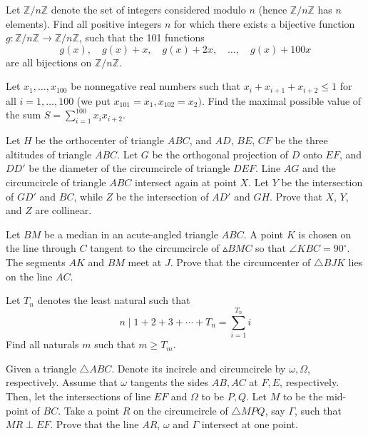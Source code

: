 \documentclass[11pt]{scrartcl}
\begin{document}
\begin{problem}[1856371892766039579]
Let $\mathbb{Z}/n\mathbb{Z}$ denote the set of integers considered modulo $n$ (hence $\mathbb{Z}/n\mathbb{Z}$ has $n$ elements). Find all positive integers $n$ for which there exists a bijective function $g: \mathbb{Z}/n\mathbb{Z} \to \mathbb{Z}/n\mathbb{Z}$, such that the 101 functions
\[g(x), \quad g(x) + x, \quad g(x) + 2x, \quad \dots, \quad g(x) + 100x\]are all bijections on $\mathbb{Z}/n\mathbb{Z}$.
\end{problem}
\begin{problem}[1862468241301875616]
	Let $x_1, \ldots , x_{100}$ be nonnegative real numbers such that $x_i + x_{i+1} + x_{i+2} \leq 1$ for all $i = 1, \ldots , 100$ (we put $x_{101 } = x_1, x_{102} = x_2).$ Find the maximal possible value of the sum $S = \sum^{100}_{i=1} x_i x_{i+2}.$
\end{problem}
\begin{problem}[1872712387771032593]
Let $H$ be the orthocenter of triangle $ABC$, and $AD$, $BE$, $CF$ be the three altitudes of triangle $ABC$. Let $G$ be the orthogonal projection of $D$ onto $EF$, and $DD'$ be the diameter of the circumcircle of triangle $DEF$. Line $AG$ and the circumcircle of triangle $ABC$ intersect again at point $X$. Let $Y$ be the intersection of $GD'$ and $BC$, while $Z$ be the intersection of $AD'$ and $GH$. Prove that $X$, $Y$, and $Z$ are collinear.
\end{problem}
\begin{problem}[1891712635906763103]
	Let $BM$ be a median in an acute-angled triangle $ABC$. A point $K$ is chosen on the line through $C$ tangent to the circumcircle of $\vartriangle BMC$ so that $\angle KBC = 90^\circ$. The segments $AK$ and $BM$ meet at $J$. Prove that the circumcenter of $\triangle BJK$ lies on the line $AC$.
\end{problem}
\begin{problem}[1918325703156767787]
Let $T_n$ denotes the least natural such that
$$n\mid 1+2+3+\cdots +T_n=\sum_{i=1}^{T_n} i$$Find all naturals $m$ such that $m\ge T_m$.

\end{problem}
\begin{problem}[1965233157265405983]
Given a triangle $ \triangle{ABC} $. Denote its incircle and circumcircle by $ \omega, \Omega $, respectively. Assume that $ \omega $ tangents the sides $ AB, AC $ at $ F, E $, respectively. Then, let the intersections of line $ EF $ and $ \Omega $ to be $ P,Q $. Let $ M $ to be the mid-point of $ BC $. Take a point $ R $ on the circumcircle of $ \triangle{MPQ} $, say $ \Gamma $, such that $ MR \perp EF $. Prove that the line $ AR $, $ \omega $ and $ \Gamma $ intersect at one point.
\end{problem}
\end{document}
